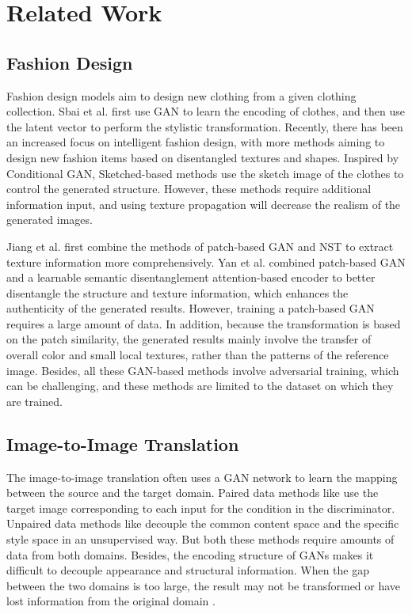 \section{Related Work}
\label{sec:related_work}

\subsection{Fashion Design}
Fashion design models aim to design new clothing from a given clothing collection. Sbai et al. \cite{sbai2018design} first use GAN to learn the encoding of clothes, and then use the latent vector to perform the stylistic transformation.
Recently, there has been an increased focus on intelligent fashion design, with more methods aiming to design new fashion items based on disentangled textures and shapes. Inspired by Conditional GAN\cite{antipov2017face}, Sketched-based methods\cite{cui2018fashiongan,yan2022toward_tmm} use the sketch image of the clothes to control the generated structure. However, these methods require additional information input, and using texture propagation will decrease the realism of the generated images.

Jiang et al. \cite{jiang2021deep} first combine the methods of patch-based GAN and NST to extract texture information more comprehensively. Yan et al. \cite{yan2023toward} combined patch-based GAN and a learnable semantic disentanglement attention-based encoder to better disentangle the structure and texture information, which enhances the authenticity of the generated results. However, training a patch-based GAN requires a large amount of data. In addition, because the transformation is based on the patch similarity, the generated results mainly involve the transfer of overall color and small local textures, rather than the patterns of the reference image. Besides, all these GAN-based methods involve adversarial training, which can be challenging, and these methods are limited to the dataset on which they are trained.


\subsection{Image-to-Image Translation}
The image-to-image translation often uses a GAN network to learn the mapping between the source and the target domain. Paired data methods like \cite{isola2017image,zhu2017toward} use the target image corresponding to each input for the condition in the discriminator. Unpaired data methods like \cite{dong2017unsupervised,huang2018multimodal,saito2020coco} decouple the common content space and the specific style space in an unsupervised way. But both these methods require amounts of data from both domains. Besides, the encoding structure of GANs makes it difficult to decouple appearance and structural information. When the gap between the two domains is too large, the result may not be transformed \cite{saito2020coco,zhu2017unpaired,lee2018diverse} or have lost information from the original domain \cite{yang2022unsupervised}.

